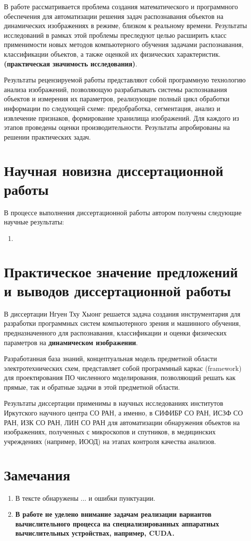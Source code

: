 \documentclass[14pt]{extarticle}
\begin{document}
В работе рассматривается проблема создания математического и программного обеспечения для автоматизации решения задач распознавания объектов на динамических изображениях в режиме, близком к реальному времени.  Результаты исследований в рамках этой проблемы преследуют целью расширить класс применимости новых методов компьютерного обучения задачами распознавания, классификации объектов, а также оценкой их физических характеристик.  \textbf{(практическая значимость исследования)}.

Результаты рецензируемой работы представляют собой программную технологию анализа изображений, позволяющую разрабатывать системы распознавания объектов и измерения их параметров, реализующие полный цикл обработки информации по следующей схеме: предобработка, сегментация, анализ и извлечение признаков, формирование хранилища изображений.  Для каждого из этапов проведены оценки производительности.  Результаты апробированы на решении практических задач.

\section{Научная новизна диссертационной работы}
\label{sec:sci-new}

В процессе выполнения диссертационной работы автором получены следующие научные результаты:
\begin{enumerate}
\item

\end{enumerate}

\section{Практическое значение предложений и выводов диссертационной работы}
\label{sec:prec-val}

В диссертации Нгуен Тху Хыонг решается задача создания инструментария для разработки программных систем компьютерного зрения и машинного обучения, предназначенного для распознавания, классификации и оценки физических параметров на \textbf{динамическом изображении}.



Разработанная база знаний, концептуальная модель предметной области электротехнических схем, представляет собой программный каркас (framework) для проектирования ПО численного моделирования, позволяющий решать как прямые, так и обратные задачи в этой предметной области.

Результаты диссертации применимы в научных исследованиях институтов Иркутского научного центра СО РАН, а именно, в СИФИБР СО РАН, ИСЗФ СО РАН, ИЗК СО РАН, ЛИН СО РАН для автоматизации обнаружения объектов на изображениях, полученных с микроскопов и спутников, в медицинских учреждениях (например, ИООД) на этапах контроля качества анализов.


\section{Замечания}
\begin{enumerate}
\item В тексте обнаружены ... и ошибки пунктуации.
\item \textbf{В работе не уделено внимание задачам реализации вариантов вычислительного процесса на специализированных аппаратных вычислительных устройствах, например, CUDA.}

\end{enumerate}
\end{document}
